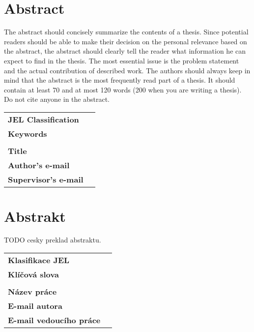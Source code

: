\section*{Abstract}

The abstract should concisely summarize the
contents of a thesis. Since potential readers should be able to
make their decision on the personal relevance based on the abstract,
the abstract should clearly tell the reader what information
he can expect to find in the thesis. The most essential issue
is the problem statement and the actual contribution of described
work. The authors should always keep in mind that the
abstract is the most frequently read part of a thesis. It should
contain at least 70 and at most 120 words (200 when you are writing a thesis).
Do not cite anyone in the abstract.

\bigskip

\begin{tabular}{lp{8.6cm}}
		\textbf{JEL Classification} & \JEL \\
		\textbf{Keywords} & \Keywords \\
 		& \\
		\textbf{Title} & \Bookname \\
 		\textbf{Author's e-mail} & \texttt{\href{mailto:\Email}{\Email}}\\
		\textbf{Supervisor's e-mail} & \texttt{\href{mailto:\EmailSup}{\EmailSup}}\\
\end{tabular}

\bigskip

\section*{Abstrakt}\label{abstract}

TODO cesky preklad abstraktu. 

\bigskip

\begin{tabular}{lp{7.7cm}}
		\textbf{Klasifikace JEL} & \JEL \\
		\textbf{Kl\'{i}\v{c}ov\'{a} slova} & \Klic \\
 		& \\
		\textbf{N\'{a}zev pr\'{a}ce} & \BooknameCZ \\
 		\textbf{E-mail autora} & \texttt{\href{mailto:\Email}{\Email}}\\
		\textbf{E-mail vedouc\'{i}ho pr\'{a}ce} & \texttt{\href{mailto:\EmailSup}{\EmailSup}}\\
\end{tabular}

